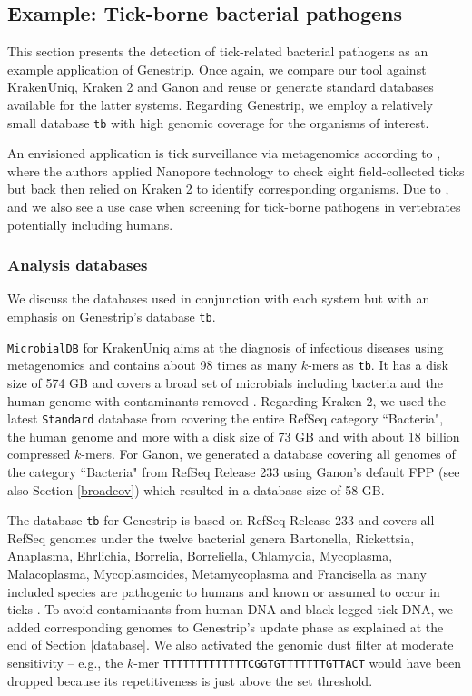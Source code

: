 \documentclass[pdflatex,sn-vancouver-num]{sn-jnl}
\begin{document}
      \subsection{Example: Tick-borne bacterial pathogens}
    \label{tickborne}

    This section presents the detection of tick-related bacterial pathogens as an example application of Genestrip. Once again, we compare our tool against KrakenUniq, Kraken 2 and Ganon and reuse or generate standard databases available for the latter systems. Regarding Genestrip, we employ a relatively small database \texttt{tb} with high genomic coverage for the organisms of interest.

    An envisioned application is tick surveillance via metagenomics according to \cite{nanoporeticks}, where the authors applied Nanopore technology to check eight field-collected ticks but back then relied on Kraken 2 to identify corresponding organisms. Due to \cite{HUGGINS2024100839}, \cite{Miao:2024aa} and \cite{Huggins:2024aa} we also see a use case when screening for tick-borne pathogens in vertebrates potentially including humans.

    \subsubsection{Analysis databases}
    \label{mdbtb}
    
    We discuss the databases used in conjunction with each system but with an emphasis on Genestrip's database \texttt{tb}.
    
    \texttt{MicrobialDB} \cite{microbialdb} for KrakenUniq aims at the diagnosis of infectious diseases using metagenomics and contains about 98 times as many $k$-mers as \texttt{tb}. It has a disk size of 574 GB and  covers a broad set of microbials including bacteria and the human genome with contaminants removed \citep{Lu:2018aa}. Regarding Kraken 2, we used the latest \texttt{Standard} database from \cite{microbialdb} covering the entire RefSeq category ``Bacteria", the human genome and more with a disk size of 73 GB and with about 18 billion compressed $k$-mers. For Ganon, we generated a database covering all genomes of the category ``Bacteria" from RefSeq Release 233 using Ganon's default FPP (see also Section \ref{broadcov}) which resulted in a database size of 58 GB.

    The database \texttt{tb} for Genestrip is based on RefSeq Release 233 and covers all RefSeq genomes under the twelve bacterial genera Bartonella, Rickettsia, Anaplasma, Ehrlichia, Borrelia, Borreliella, Chlamydia, Mycoplasma, Malacoplasma, Mycoplasmoides, Metamycoplasma and Francisella as many included species are pathogenic to humans and known or assumed to occur in ticks \citep{Eisen:2018aa, JOHNSON20181499, Janecek:2012aa, Thomas:1990aa, 10.3389/fvets.2025.1522904}. To avoid contaminants from human DNA and black-legged tick DNA, we added corresponding genomes to Genestrip's update phase as explained at the end of Section \ref{database}. We also activated the genomic dust filter at moderate sensitivity -- e.g., the $k$-mer \texttt{TTTTTTTTTTTTTCGGTGTTTTTTTGTTACT} would have been dropped because its repetitiveness is just above the set threshold.
\end{document}
